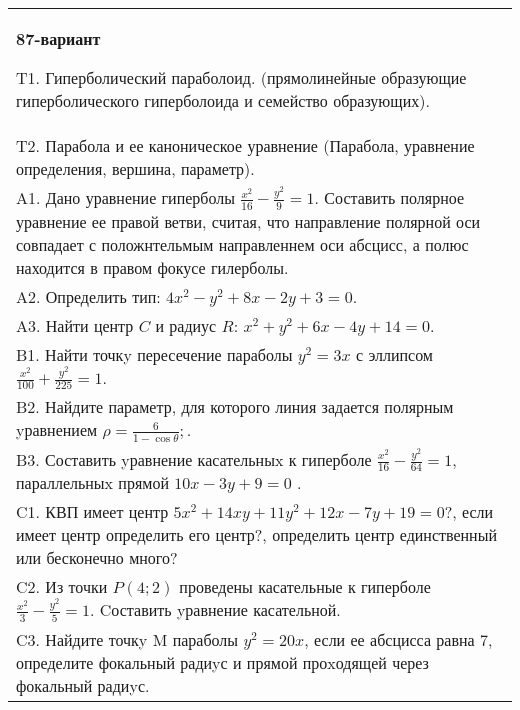 \documentclass{article}
\begin{document}
\begin{tabular}{m{17cm}}
\textbf{87-вариант}
\newline

T1. Гиперболический параболоид. (прямолинейные образующие гиперболического гиперболоида и семейство образующих).\\

T2. Парабола и ее каноническое уравнение (Парабола, уравнение определения, вершина, параметр).\\

A1. Дано уравнение гиперболы $\frac{x^{2}}{16}-\frac{y^{2}}{9}=1$. Составить полярное уравнение ее правой ветви, считая, что направление полярной оси совпадает с положнтельмым направленнем оси абсцисс, а полюс находится в правом фокусе гилерболы.\\

A2. Определить тип: $4x^{2}-y^{2}+8x-2y+3=0$.\\

A3. Найти центр $C$ и радиус $R$: $x^2+y^2+6x-4y+14=0$.\\

B1. Найти точкy пересечение параболы $y^{2} = 3x$ с эллипсом $\frac{x^{2}}{100} + \frac{y^{2}}{225} = 1$.  \\

B2. Найдите параметр, для которого линия задается полярным yравнением $\rho = \frac{6}{1 - \cos \theta};$.  \\

B3. Составить yравнение касательныx к гиперболе $\frac{x^{2}}{16} - \frac{y^{2}}{64} = 1$, параллельныx прямой $10x - 3y + 9 = 0$ .  \\

C1. КВП имеет центр $5x^{2}+14xy+11y^{2}+12x-7y+19=0$?, если имеет центр определить его центр?, определить центр единственный или бесконечно много?  \\

C2. Из точки $P(4;2)$ проведены касательные к гиперболе $\frac{x^{2}}{3}-\frac{y^{2}}{5}=1$. Cоставить yравнение касательной.  \\

C3. Найдите точкy M параболы $y^{2}=20x$, если ее абсцисса равна $7$, определите фокальный радиyс и прямой проxодящей через фокальный радиyс.  \\

\end{tabular}
\vspace{1cm}
\end{document}
